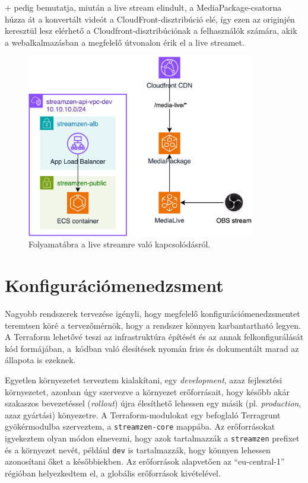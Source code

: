 \Az+ pedig bemutatja, miután a live stream elindult, a MediaPackage-csatorna húzza át a konvertált videót a CloudFront-disztribúció elé, így ezen az originjén keresztül lesz elérhető a Cloudfront-disztribúciónak a felhasználók számára, akik a webalkalmazásban a megfelelő útvonalon érik el a live streamet.

\begin{figure}[h]
	\centering
	\includegraphics[height=80mm, keepaspectratio]{figures/dipterv_live2.png}
	\caption{Folyamatábra a live streamre való kapcsolódásról.}
	\label{fig:live2}
\end{figure}

\section{Konfigurációmenedzsment}\label{sec:config}

Nagyobb rendszerek tervezése igényli, hogy megfelelő konfigurációmenedzsmentet teremtsen köré a tervezőmérnök, hogy a rendszer könnyen karbantartható legyen. A Terraform lehetővé teszi az infrastruktúra építését és az annak felkonfigurálását kód formájában, a~kódban való élesítések nyomán friss és dokumentált marad az állapota is ezeknek.

Egyetlen környezetet terveztem kialakítani, egy \emph{development}, azaz fejlesztési környezetet, azonban úgy szervezve a környezet erőforrásait, hogy később akár szakaszos bevezetéssel (\emph{rollout}) újra élesíthető lehessen egy másik (pl. \emph{production}, azaz gyártási) könyezetre. A Terraform-modulokat egy befoglaló Terragrunt gyökérmodulba szerveztem, a \verb|streamzen-core| mappába. Az erőforrásokat igyekeztem olyan módon elnevezni, hogy azok tartalmazzák a \verb|streamzen| prefixet és a környezet nevét, például \verb|dev| is tartalmazzák, hogy könnyen lehessen azonosítani őket a későbbiekben. Az erőforrások alapvetően az ``eu-central-1'' régióban helyezkedtem el, a globális erőforrások kivételével.

